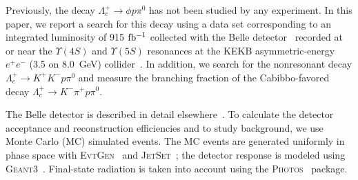 \documentclass[aps,prl,twocolumn,superscriptaddress,showpacs,preprintnumbers,amsmath,amssymb]{revtex4-1}
\begin{document}
Previously, the decay $\Lambda_c^+\to\phi p\pi^0$ has not been studied by any experiment. In this paper, we report a search for this decay  using a data set corresponding to an integrated luminosity of 915 $\rm fb^{-1}$ collected with the Belle detector~\cite{Belle} recorded at or near the $\Upsilon(4S)$ and $\Upsilon(5S)$ resonances at the KEKB asymmetric-energy $e^+e^-$ (3.5 on 8.0~GeV) collider~\cite{KEKB}. %
In addition, we search for the nonresonant decay $\Lambda_c^+\to K^+K^-p\pi^0$ and measure the branching fraction of the  Cabibbo-favored decay $\Lambda_c^+\to K^-\pi^+p\pi^0$.

The Belle detector is %
described in detail elsewhere~\cite{Belle}. To calculate the detector acceptance and reconstruction efficiencies and to study background, we use Monte Carlo (MC) simulated events. The MC events are generated uniformly in phase space  with
{\mbox{\textsc{EvtGen}}\xspace}~\cite{Lange:2001uf} and {\mbox{\textsc{JetSet}}\xspace}~\cite{Sjostrand:1993yb}; the detector response is modeled using {\mbox{\textsc{Geant3}}\xspace}~\cite{geant3}. Final-state radiation is taken into account using the {\mbox{\textsc{Photos}}\xspace}~\cite{Barberio:1993qi} package.
\end{document}

